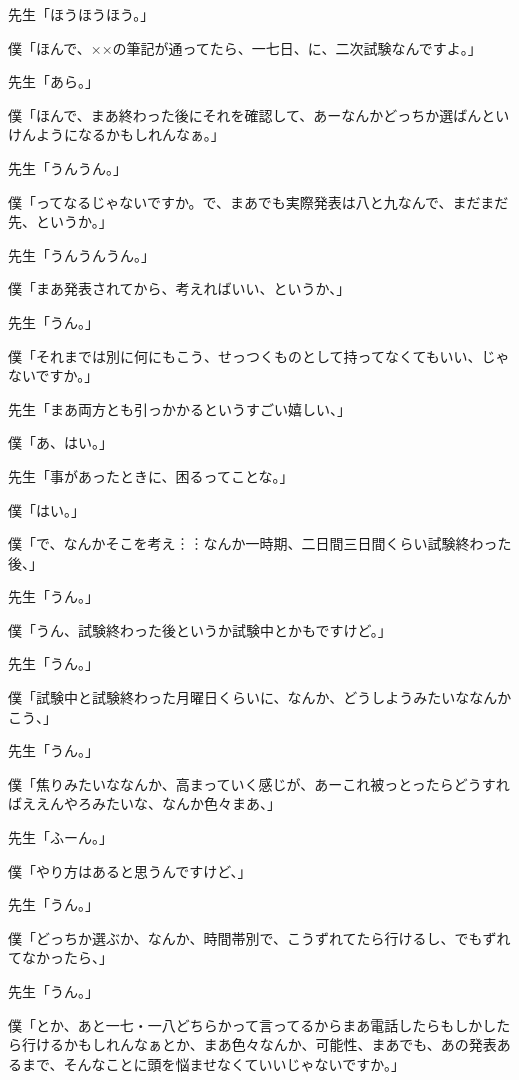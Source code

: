 \documentclass[b5j,twoside,twocolumn]{utarticle}
\begin{document}
\begin{description}
\item 先生「ほうほうほう。」
\item 僕「ほんで、××の筆記が通ってたら、一七日、に、二次試験なんですよ。」
\item 先生「あら。」
\item 僕「ほんで、まあ終わった後にそれを確認して、あーなんかどっちか選ばんといけんようになるかもしれんなぁ。」
\item 先生「うんうん。」
\item 僕「ってなるじゃないですか。で、まあでも実際発表は八と九なんで、まだまだ先、というか。」
\item 先生「うんうんうん。」
\item 僕「まあ発表されてから、考えればいい、というか、」
\item 先生「うん。」
\item 僕「それまでは別に何にもこう、せっつくものとして持ってなくてもいい、じゃないですか。」
\item 先生「まあ両方とも引っかかるというすごい嬉しい、」
\item 僕「あ、はい。」
\item 先生「事があったときに、困るってことな。」
\item 僕「はい。」
\item 僕「で、なんかそこを考え︙︙なんか一時期、二日間三日間くらい試験終わった後、」
\item 先生「うん。」
\item 僕「うん、試験終わった後というか試験中とかもですけど。」
\item 先生「うん。」
\item 僕「試験中と試験終わった月曜日くらいに、なんか、どうしようみたいななんかこう、」
\item 先生「うん。」
\item 僕「焦りみたいななんか、高まっていく感じが、あーこれ被っとったらどうすればええんやろみたいな、なんか色々まあ、」
\item 先生「ふーん。」
\item 僕「やり方はあると思うんですけど、」
\item 先生「うん。」
\item 僕「どっちか選ぶか、なんか、時間帯別で、こうずれてたら行けるし、でもずれてなかったら、」
\item 先生「うん。」
\item 僕「とか、あと一七・一八どちらかって言ってるからまあ電話したらもしかしたら行けるかもしれんなぁとか、まあ色々なんか、可能性、まあでも、あの発表あるまで、そんなことに頭を悩ませなくていいじゃないですか。」

\end{description}
\end{document}
